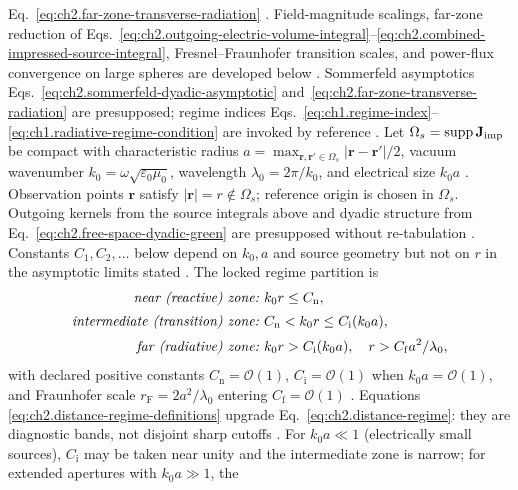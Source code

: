 Eq.~\eqref{eq:ch2.far-zone-transverse-radiation} \cite{harrington2001}.
Field-magnitude scalings, far-zone reduction of
Eqs.~\eqref{eq:ch2.outgoing-electric-volume-integral}--\eqref{eq:ch2.combined-impressed-source-integral},
Fresnel--Fraunhofer transition scales, and power-flux convergence on large spheres are
developed below \cite{stratton1941}. Sommerfeld asymptotics
Eqs.~\eqref{eq:ch2.sommerfeld-dyadic-asymptotic} and~\eqref{eq:ch2.far-zone-transverse-radiation}
are presupposed; regime indices
Eqs.~\eqref{eq:ch1.regime-index}--\eqref{eq:ch1.radiative-regime-condition} are invoked by
reference \cite{stratton1941}.
Let \(\Omega_s=\operatorname{supp}\mathbf{J}_{\mathrm{imp}}\) be compact with characteristic radius
\(a=\max_{\mathbf{r},\mathbf{r}'\in\Omega_s}|\mathbf{r}-\mathbf{r}'|/2\), vacuum
wavenumber \(k_0=\omega\sqrt{\varepsilon_0\mu_0}\), wavelength \(\lambda_0=2\pi/k_0\),
and electrical size \(k_0 a\) \cite{stratton1941}. Observation points
\(\mathbf{r}\) satisfy \(|\mathbf{r}|=r\notin\Omega_s\); reference origin is chosen in
\(\Omega_s\). Outgoing kernels from the source integrals above and dyadic structure from
Eq.~\eqref{eq:ch2.free-space-dyadic-green} are presupposed without re-tabulation
\cite{stratton1941}. Constants \(C_1,C_2,\ldots\) below depend on \(k_0,a\) and source
geometry but not on \(r\) in the asymptotic limits stated \cite{harrington2001}.
The locked regime partition is
\begin{equation}
\label{eq:ch2.distance-regime-definitions}
\begin{aligned}
\text{\emph{near (reactive) zone:}}\ & k_0 r\le C_{\mathrm{n}},\\[2pt]
\text{\emph{intermediate (transition) zone:}}\ &
C_{\mathrm{n}}<k_0 r\le C_{\mathrm{i}}(k_0 a),\\[2pt]
\text{\emph{far (radiative) zone:}}\ &
k_0 r> C_{\mathrm{i}}(k_0 a),\quad r> C_{\mathrm{f}}a^{2}/\lambda_0,
\end{aligned}
\end{equation}
with declared positive constants \(C_{\mathrm{n}}=\mathcal{O}(1)\),
\(C_{\mathrm{i}}=\mathcal{O}(1)\) when \(k_0 a=\mathcal{O}(1)\), and Fraunhofer scale
\(r_{\mathrm{F}}=2a^{2}/\lambda_0\) entering \(C_{\mathrm{f}}=\mathcal{O}(1)\)
\cite{stratton1941}. Equations
\eqref{eq:ch2.distance-regime-definitions} upgrade Eq.~\eqref{eq:ch2.distance-regime}:
they are diagnostic bands, not disjoint sharp cutoffs \cite{stratton1941}. For
\(k_0 a\ll 1\) (electrically small sources), \(C_{\mathrm{i}}\) may be taken near unity
and the intermediate zone is narrow; for extended apertures with \(k_0 a\gg 1\), the
